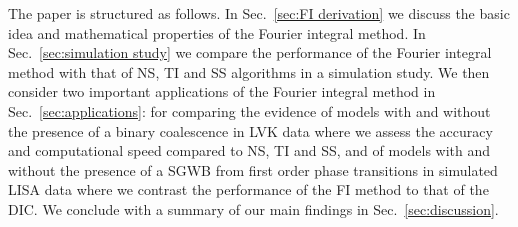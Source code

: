 \documentclass[%
 reprint,
 amsmath,amssymb,
 aps,
]{revtex4-2}
\begin{document}
The paper is structured as follows. In Sec.~\ref{sec:FI derivation} we discuss the basic idea and mathematical properties of the Fourier integral method. In Sec.~\ref{sec:simulation study} we compare the performance of the Fourier integral method with that of NS, TI and SS  algorithms in a simulation study. We then consider two important applications of the Fourier integral method in Sec.~\ref{sec:applications}: for comparing the evidence of models with and without the presence of a binary coalescence in LVK data where we assess the accuracy and computational speed compared to NS, TI and SS, and of models with and without the presence of a SGWB from first order phase transitions in simulated LISA data where we contrast the performance of the FI method to that of the DIC. We conclude with a summary of our main findings in Sec.~\ref{sec:discussion}.
\end{document}

